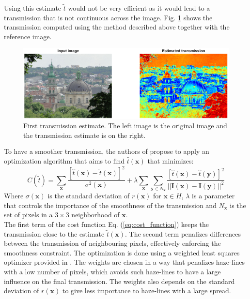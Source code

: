\documentclass[conference]{IEEEtran}
\begin{document}
Using this estimate $\tilde{t}$ would not be very efficient as it would lead to a transmission that is not continuous across the image. Fig. \ref{fig:first_transmission} shows the transmission computed using the method described above together with the reference image.\par
\begin{figure}
    \centering
    \includegraphics[width=\linewidth]{img/noOpti.png}
    \caption{First transmission estimate. The left image is the original image and the transmission estimate is on the right.}
    \label{fig:first_transmission}
\end{figure}
To have a smoother transmission, the authors of \cite{dehaze} propose to apply an optimization algorithm that aims to find $\hat{t}(\mathbf{x})$ that minimizes:
\begin{equation}
    \label{eq:cost_function}
    C(\tilde{t}) = \sum_{\mathbf{x}} \frac{\left[\hat{t}(\mathbf{x}) - \tilde{t}(\mathbf{x})\right]^2}{\sigma^2(\mathbf{x})} + \lambda \sum_{\mathbf{x}} \sum_{\mathbf{y} \in N_{\mathbf{x}}} \frac{\left[\hat{t}(\mathbf{x}) - \hat{t}(\mathbf{y})\right]^2}{||\mathbf{I}(\mathbf{x}) - \mathbf{I}(\mathbf{y})||^2}
\end{equation}
Where $\sigma(\mathbf{x})$ is the standard deviation of $r(\mathbf{x})$ for $\mathbf{x} \in H$, $\lambda$ is a parameter that controls the importance of the smoothness of the transmission and $N_{\mathbf{x}}$ is the set of pixels in a $3 \times 3$ neighborhood of $\mathbf{x}$.\\
The first term of the cost function Eq. (\ref{eq:cost_function}) keeps the transmission close to the estimate $\tilde{t}(\mathbf{x})$. The second term penalizes differences between the transmission of neighbouring pixels, effectively enforcing the smoothness constraint. 
The optimization is done using a weighted least squares optimizer provided in \cite{github}. The weights are chosen in a way that penalizes haze-lines with a low number of pixels, which avoids such haze-lines to have a large influence on the final transmission. The weights also depends on the standard deviation of $r(\mathbf{x})$ to give less importance to haze-lines with a large spread. \par
\end{document}
